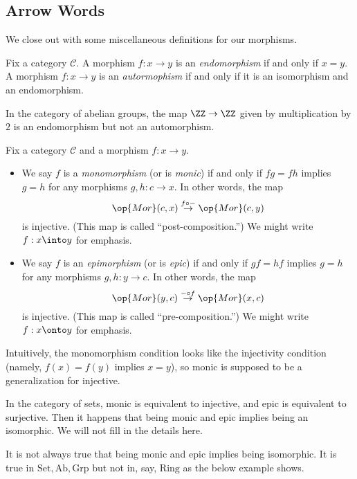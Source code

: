 \subsection{Arrow Words}
We close out with some miscellaneous definitions for our morphisms.
\begin{definition}
	Fix a category $\mathcal C$. A morphism $f:x\to y$ is an \textit{endomorphism} if and only if $x=y$. A morphism $f:x\to y$ is an \textit{autormophism} if and only if it is an isomorphism and an endomorphism.
\end{definition}
\begin{example}
	In the category of abelian groups, the map $\ZZ\to\ZZ$ given by multiplication by $2$ is an endomorphism but not an automorphism.
\end{example}
\begin{definition}
	Fix a category $\mathcal C$ and a morphism $f:x\to y$.
	\begin{itemize}
		\item We say $f$ is a \textit{monomorphism} (or is \textit{monic}) if and only if $fg=fh$ implies $g=h$ for any morphisms $g,h:c\to x$. In other words, the map
		\[\op{Mor}(c,x)\stackrel{f\circ-}\to\op{Mor}(c,y)\]
		is injective. (This map is called ``post-composition.'') We might write $f:x\into y$ for emphasis.
		\item We say $f$ is an \textit{epimorphism} (or is \textit{epic}) if and only if $gf=hf$ implies $g=h$ for any morphisms $g,h:y\to c$. In other words, the map
		\[\op{Mor}(y,c)\stackrel{-\circ f}\to\op{Mor}(x,c)\]
		is injective. (This map is called ``pre-composition.'') We might write $f:x\onto y$ for emphasis.
	\end{itemize}
\end{definition}
Intuitively, the monomorphism condition looks like the injectivity condition (namely, $f(x)=f(y)$ implies $x=y$), so monic is supposed to be a generalization for injective.
\begin{example}
	In the category of sets, monic is equivalent to injective, and epic is equivalent to surjective. Then it happens that being monic and epic implies being an isomorphic. We will not fill in the details here.
\end{example}
\begin{warn}
	It is not always true that being monic and epic implies being isomorphic. It is true in $\mathrm{Set},\mathrm{Ab},\mathrm{Grp}$ but not in, say, $\mathrm{Ring}$ as the below example shows.
\end{warn}
